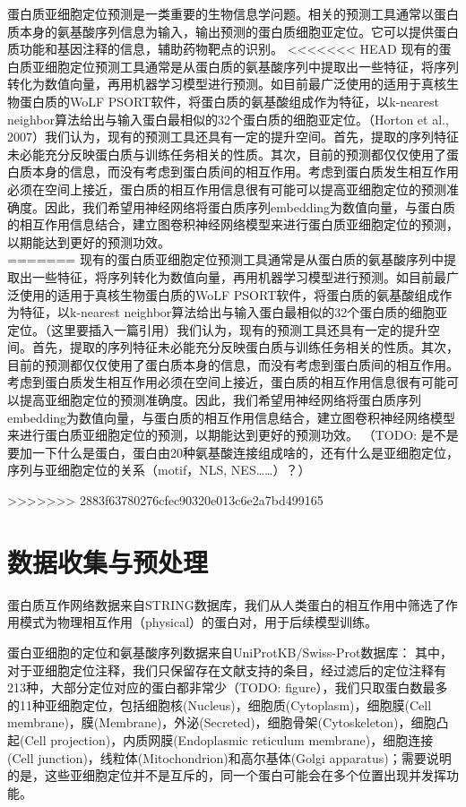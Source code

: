 \documentclass[a4paper,UTF8]{article}
\begin{document}
蛋白质亚细胞定位预测是一类重要的生物信息学问题。相关的预测工具通常以蛋白质本身的氨基酸序列信息为输入，输出预测的蛋白质细胞亚定位。它可以提供蛋白质功能和基因注释的信息，辅助药物靶点的识别。
<<<<<<< HEAD
现有的蛋白质亚细胞定位预测工具通常是从蛋白质的氨基酸序列中提取出一些特征，将序列转化为数值向量，再用机器学习模型进行预测。如目前最广泛使用的适用于真核生物蛋白质的WoLF PSORT软件，将蛋白质的氨基酸组成作为特征，以k-nearest neighbor算法给出与输入蛋白最相似的32个蛋白质的细胞亚定位。（Horton et al., 2007）我们认为，现有的预测工具还具有一定的提升空间。首先，提取的序列特征未必能充分反映蛋白质与训练任务相关的性质。其次，目前的预测都仅仅使用了蛋白质本身的信息，而没有考虑到蛋白质间的相互作用。考虑到蛋白质发生相互作用必须在空间上接近，蛋白质的相互作用信息很有可能可以提高亚细胞定位的预测准确度。因此，我们希望用神经网络将蛋白质序列embedding为数值向量，与蛋白质的相互作用信息结合，建立图卷积神经网络模型来进行蛋白质亚细胞定位的预测，以期能达到更好的预测功效。\\
=======
现有的蛋白质亚细胞定位预测工具通常是从蛋白质的氨基酸序列中提取出一些特征，将序列转化为数值向量，再用机器学习模型进行预测。如目前最广泛使用的适用于真核生物蛋白质的WoLF PSORT软件，将蛋白质的氨基酸组成作为特征，以k-nearest neighbor算法给出与输入蛋白最相似的32个蛋白质的细胞亚定位。（这里要插入一篇引用）我们认为，现有的预测工具还具有一定的提升空间。首先，提取的序列特征未必能充分反映蛋白质与训练任务相关的性质。其次，目前的预测都仅仅使用了蛋白质本身的信息，而没有考虑到蛋白质间的相互作用。考虑到蛋白质发生相互作用必须在空间上接近，蛋白质的相互作用信息很有可能可以提高亚细胞定位的预测准确度。因此，我们希望用神经网络将蛋白质序列embedding为数值向量，与蛋白质的相互作用信息结合，建立图卷积神经网络模型来进行蛋白质亚细胞定位的预测，以期能达到更好的预测功效。
（TODO: 是不是要加一下什么是蛋白，蛋白由20种氨基酸连接组成啥的，还有什么是亚细胞定位，序列与亚细胞定位的关系（motif，NLS, NES……）？）


>>>>>>> 2883f63780276cfec90320e013c6e2a7bd499165

\section{数据收集与预处理}

蛋白质互作网络数据来自STRING数据库，我们从人类蛋白的相互作用中筛选了作用模式为物理相互作用（physical）的蛋白对，用于后续模型训练。

蛋白亚细胞的定位和氨基酸序列数据来自UniProtKB/Swiss-Prot数据库：
其中，对于亚细胞定位注释，我们只保留存在文献支持的条目，经过滤后的定位注释有213种，大部分定位对应的蛋白都非常少（TODO: figure），我们只取蛋白数最多的11种亚细胞定位，包括细胞核(Nucleus)，细胞质(Cytoplasm)，细胞膜(Cell membrane)，膜(Membrane)，外泌(Secreted)，细胞骨架(Cytoskeleton)，细胞凸起(Cell projection)，内质网膜(Endoplasmic reticulum membrane)，细胞连接(Cell junction)，线粒体(Mitochondrion)和高尔基体(Golgi apparatus)；需要说明的是，这些亚细胞定位并不是互斥的，同一个蛋白可能会在多个位置出现并发挥功能。
\end{document}
